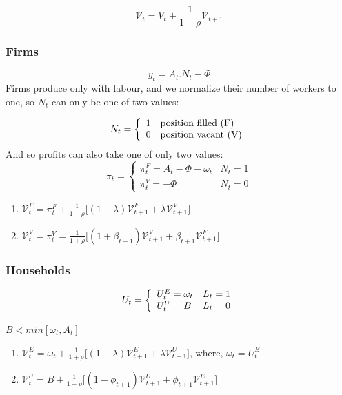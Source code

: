 \begin{equation*}
    \mathcal{V}_{t}=V_{t}+\frac{1}{1+\rho}\mathcal{V}_{t+1}
\end{equation*}

\subsubsection{Firms}
\begin{equation*}
y_{t}=A_{t}.N_{t}-\Phi
\end{equation*}
Firms produce only with labour, and we normalize their number of workers to one, so $N_{t}$ can only be one of two values: 

\[ 
N_{t}=\left\{
\begin{array}{l l}
    1 & \text{position filled (F)}  \\
    0 & \text {position vacant (V)}
\end{array}
\right.
\]
And so profits can also take one of only two values: 
\[ 
\pi_{t}=\left\{
\begin{array}{cc}
    \pi_{t}^{F}=A_{t}-\Phi-\omega_{t} & N_{t}=1  \\
     \pi_{t}^{V}=-\Phi & N_{t}=0 
\end{array}
\right.
\]

\begin{enumerate}
    \item $\mathcal{V}_{t}^{F}=\pi_{t}^{F}+\frac{1}{1+\rho}\bigg[(1-\lambda)\mathcal{V}_{t+1}^{F}+\lambda\mathcal{V}_{t+1}^{V} \bigg]$
    \item $\mathcal{V}_{t}^{V}=\pi^{V}_{t}=\frac{1}{1+\rho}\bigg[(1+\beta_{t+1})\mathcal{V}_{t+1}^{V}+\beta_{t+1}\mathcal{V}_{t+1}^{F} \bigg]$
\end{enumerate}

\subsubsection{Households}
\[ 
U_{t}=\left\{
\begin{array}{l l}
     U_{t}^{E}=\omega_{t} & L_{t}=1  \\
     U_{t}^{U}=B & L_{t}=0 
\end{array}
\right.
\]

$B< min [\omega_{t}, A_{t}]$

\begin{enumerate}
    \item $\mathcal{V}_{t}^{E}=\omega_{t}+\frac{1}{1+\rho}\bigg[ (1-\lambda)\mathcal{V}_{t+1}^{E}+\lambda\mathcal{V}_{t+1}^{U} \bigg] $, where, $\omega_{t}=U_{t}^{E}$
    \item $\mathcal{V}_{t}^{U}=B+\frac{1}{1+\rho}\bigg[ (1-\phi_{t+1})\mathcal{V}_{t+1}^{U}+\phi_{t+1}\mathcal{V}_{t+1}^{E} \bigg] $
\end{enumerate}

